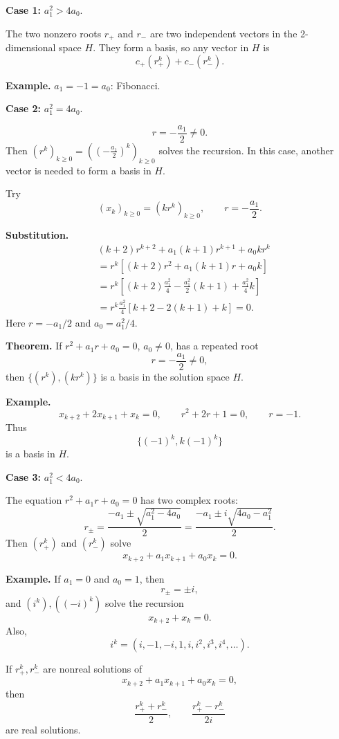 \documentclass[letterpaper]{article}
\begin{document}
\newpage

\textbf{Case 1:} $a_1^2>4a_0$.

\medskip

The two nonzero roots $r_+$ and $r_-$ are two independent vectors in the 2-dimensional space $H$. They form a basis, so any vector in $H$ is
\[
c_+(r_+^k)+c_-(r_-^k).
\]

\textbf{Example.} $a_1=-1=a_0$: Fibonacci.

\bigskip

\textbf{Case 2:} $a_1^2=4a_0$.

\[
r=-\frac{a_1}{2}\ne0.
\]
Then $(r^k)_{k\geq0}=\left(\left(-\frac{a_1}{2}\right)^k\right)_{k\geq0}$ solves the recursion. In this case, another vector is needed to form a basis in $H$.

Try
\[
(x_k)_{k\geq0}=(kr^k)_{k\geq0},
\qquad r=-\frac{a_1}{2}.
\]

\textbf{Substitution.}
\begin{align*}
&(k+2)r^{k+2}+a_1(k+1)r^{k+1}+a_0kr^k\\
&=r^k\left[(k+2)r^2+a_1(k+1)r+a_0k\right]\\
&=r^k\left[(k+2)\frac{a_1^2}{4}-\frac{a_1^2}{2}(k+1)+\frac{a_1^2}{4}k\right]\\
&=r^k\frac{a_1^2}{4}\left[k+2-2(k+1)+k\right]=0.
\end{align*}
Here $r=-a_1/2$ and $a_0=a_1^2/4$.

\bigskip

\textbf{Theorem.} If $r^2+a_1r+a_0=0$, $a_0\ne0$, has a repeated root
\[
r=-\frac{a_1}{2}\ne0,
\]
then $\{(r^k),(kr^k)\}$ is a basis in the solution space $H$.

\textbf{Example.}
\[
x_{k+2}+2x_{k+1}+x_k=0,
\qquad r^2+2r+1=0,
\qquad r=-1.
\]
Thus
\[
\{(-1)^k,k(-1)^k\}
\]
is a basis in $H$.

\newpage

\textbf{Case 3:} $a_1^2<4a_0$.

The equation $r^2+a_1r+a_0=0$ has two complex roots:
\[
r_\pm=\frac{-a_1\pm\sqrt{a_1^2-4a_0}}{2}
=\frac{-a_1\pm i\sqrt{4a_0-a_1^2}}{2}.
\]
Then $(r_+^k)$ and $(r_-^k)$ solve
\[
x_{k+2}+a_1x_{k+1}+a_0x_k=0.
\]

\textbf{Example.} If $a_1=0$ and $a_0=1$, then
\[
r_\pm=\pm i,
\]
and $(i^k),((-i)^k)$ solve the recursion
\[
x_{k+2}+x_k=0.
\]
Also,
\[
i^k=(i,-1,-i,1,i,i^2,i^3,i^4,\ldots).
\]

\bigskip

If $r_+^k,r_-^k$ are nonreal solutions of
\[
x_{k+2}+a_1x_{k+1}+a_0x_k=0,
\]
then
\[
\frac{r_+^k+r_-^k}{2},
\qquad
\frac{r_+^k-r_-^k}{2i}
\]
are real solutions.
\end{document}
